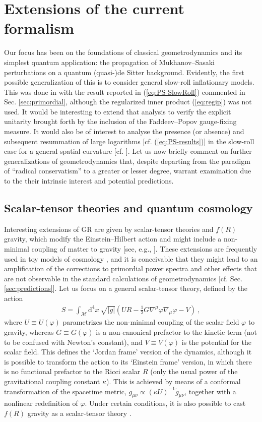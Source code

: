 \documentclass[12pt]{iopart}
\def\eq#1{\begin{equation}\begin{aligned}#1\end{aligned}\end{equation}}
\def\eref#1{(\ref{eq:#1})}
\def\D{\mathrm{d}}
\begin{document}
\section{Extensions of the current formalism}
Our focus has been on the foundations of classical geometrodynamics and its simplest quantum application: the propagation of Mukhanov--Sasaki perturbations on a quantum (quasi-)de Sitter background. Evidently, the first possible generalization of this is to consider general slow-roll inflationary models. This was done in \citet{Brizuela:2016gnz} with the result reported in \eref{PS-SlowRoll} commented in Sec. \ref{sec:primordial}, although the regularized inner product \eref{regip} was not used. It would be interesting to extend that analysis to verify the explicit unitarity brought forth by the inclusion of the Faddeev--Popov gauge-fixing measure. It would also be of interest to analyse the presence (or absence) and subsequent resummation of large logarithms [cf. \eref{PS-results}] in the slow-roll case for a general spatial curvature [cf. \citet{Kiefer:2021iko}]. Let us now briefly comment on further generalizations of geometrodynamics that, despite departing from the paradigm of ``radical conservatism'' to a greater or lesser degree, warrant examination due to the their intrinsic interest and potential predictions.

\subsection{Scalar-tensor theories and quantum cosmology}
Interesting extensions of GR are given by scalar-tensor theories and $f(R)$ gravity, which modify the Einstein--Hilbert action and might include a non-minimal coupling of matter to gravity [see, e.g., \citet{Sotiriou:2006hs}]. These extensions are frequently used in toy models of cosmology \citep{Nojiri:2010wj}, and it is conceivable that they might lead to an amplification of the corrections to primordial power spectra and other effects that are not observable in the standard calculations of geometrodynamics [cf. Sec. \ref{sec:predictions}]. Let us focus on a general scalar-tensor theory, defined by the action
\eq{\label{eq:action-scalar-tensor}
S = \int_{\mathcal{M}}\D^4 x\ \sqrt{|g|} \left(UR -\frac12 G\nabla^{\mu}\varphi\nabla_{\mu}\varphi-V\right) \ ,
}
where $U\equiv U(\varphi)$ parametrizes the non-minimal coupling of the scalar field $\varphi$ to gravity, whereas $G\equiv G(\varphi)$ is a non-canonical prefactor to the kinetic term (not to be confused with Newton's constant), and $V\equiv V(\varphi)$ is the potential for the scalar field. This defines the `Jordan frame' version of the dynamics, although it is possible to transform the action to its `Einstein frame' version, in which there is no functional prefactor to the Ricci scalar $R$ (only the usual power of the gravitational coupling constant $\kappa$). This is achieved by means of a conformal transformation of the spacetime metric, $g_{\mu\nu}\propto(\kappa U)^{-1} \tilde{g}_{\mu\nu}$, together with a nonlinear redefinition of $\varphi$. Under certain conditions, it is also possible to cast $f(R)$ gravity as a scalar-tensor theory \citep{Sotiriou:2006hs,vanderWild:2019lah}.
\end{document}
